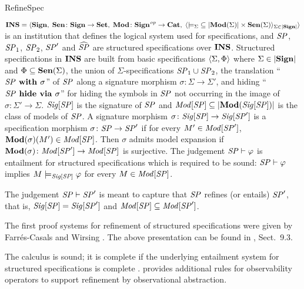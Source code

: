 \begin{entry}{RefineSpec}
 \begin{clarifications}
${\bf INS} = \langle{{\bf Sign},\; {\bf Sen}\colon{\bf Sign}\to{\bf Set},\; {\bf Mod}\colon{\bf Sign}^{\mathit{op}}\to{\bf Cat},\;
      \langle{{\models_\Sigma}\subseteq|{\bf Mod}(\Sigma)|\times{\bf Sen}(\Sigma)}\rangle_{\Sigma\in|{\bf Sign}|}}\rangle$
is an institution that defines the logical system used for specifications, and
$\mathit{SP}$, $\mathit{SP}_1$, $\mathit{SP}_2$, $\mathit{SP}'$ and $\widehat{\mathit{SP}}$ are structured specifications over ${\bf INS}$.
Structured specifications in ${\bf INS}$ are built from basic specifications
$\langle{\Sigma, \Phi}\rangle$ where $\Sigma\in|{\bf Sign}|$ and $\Phi\subseteq{\bf Sen}(\Sigma)$,
the union of $\Sigma$-specifications $\mathit{SP}_1 \cup \mathit{SP}_2$,
the translation ``$\mathit{SP}\textbf{\upshape{} with }\sigma$'' of $\mathit{SP}$
    along a signature morphism $\sigma\colon\Sigma\to\Sigma'$,
and hiding ``$\mathit{SP}\textbf{\upshape{} hide via }\sigma$'' for hiding the symbols in $\mathit{SP}$
    not occurring in the image of $\sigma\colon\Sigma'\to\Sigma$.
${\mathit{Sig}}[\mathit{SP}]$ is the signature of $\mathit{SP}$ and
${\mathit{Mod}}[\mathit{SP}]\subseteq|{\bf Mod}({\mathit{Sig}}[\mathit{SP}])|$ is the class of models of $\mathit{SP}$.
A signature morphism $\sigma\colon{\mathit{Sig}}[\mathit{SP}]\to{\mathit{Sig}}[\mathit{SP}']$
is a specification morphism $\sigma\colon\mathit{SP}\to\mathit{SP}'$
if for every $M'\in{\mathit{Mod}}[\mathit{SP}']$, ${\bf Mod}(\sigma)(M')\in{\mathit{Mod}}[\mathit{SP}]$.
Then $\sigma$ admits model expansion
if ${\bf Mod}(\sigma)\colon{\mathit{Mod}}[\mathit{SP}']\to{\mathit{Mod}}[\mathit{SP}]$ is surjective.
The judgement $\mathit{SP}\vdash\varphi$ is entailment for structured specifications
which is required to be sound:
$\mathit{SP}\vdash\varphi$ implies $M\models_{{\mathit{Sig}}[\mathit{SP}]}\varphi$
for every $M\in{\mathit{Mod}}[\mathit{SP}]$.

The judgement $\mathit{SP}\vdash\mathit{SP}'$ is meant to capture that
$\mathit{SP}$ refines (or entails) $\mathit{SP}'$, that is,
${\mathit{Sig}}[\mathit{SP}] = {\mathit{Sig}}[\mathit{SP}']$ and ${\mathit{Mod}}[\mathit{SP}]\subseteq{\mathit{Mod}}[\mathit{SP}']$.
\end{clarifications}

\begin{history}
The first proof systems for refinement of structured specifications were given
by Farr\'es-Casals \cite{Far89} and Wirsing \cite{Wir91}.
The above presentation can be found in \cite{ST12}, Sect.~9.3.
\end{history}

\begin{technicalities}
The calculus is sound; it is complete if the underlying entailment system for
structured specifications is complete \cite{Wir91, ST12}. 
 \cite{RH97} provides additional rules for observability operators to support refinement by observational abstraction.
\end{technicalities}
\end{entry}
